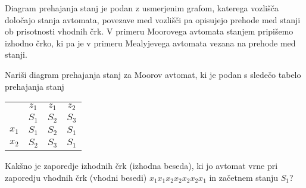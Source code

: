 \bigskip

Diagram prehajanja stanj je podan z usmerjenim grafom, katerega vozlišča določajo stanja avtomata, povezave med vozlišči pa opisujejo prehode med stanji ob prisotnosti vhodnih črk. V primeru Moorovega avtomata stanjem pripišemo izhodno črko, ki pa je v primeru Mealyjevega avtomata vezana na prehode med stanji.

\begin{zgled}
\label{Moore_basic}
Nariši diagram prehajanja stanj za Moorov avtomat, ki je podan s sledečo tabelo prehajanja stanj

\begin{center}
\begin{tabular}{c|ccc}
 & $z_1$ & $z_1$ & $z_2$\\
 & $S_1$ & $S_2$ & $S_3$\\
\hline
$x_1$ & $S_1$ & $S_2$ & $S_1$\\
$x_2$ & $S_2$ & $S_3$ & $S_1$
\end{tabular}
\end{center}

Kakšno je zaporedje izhodnih črk (izhodna beseda), ki jo avtomat vrne pri zaporedju vhodnih črk (vhodni besedi) $x_1 x_1 x_2 x_2 x_2 x_2 x_1$ in začetnem stanju $S_1$?


\bigskip

\end{zgled}


